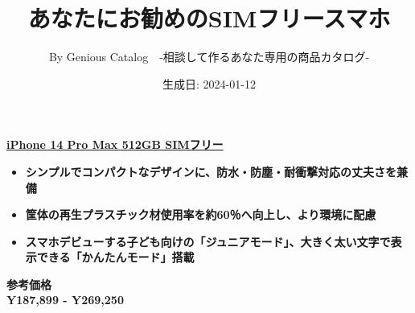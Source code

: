\documentclass[lualatex,paper=a4,airticle]{jlreq}
\title{\vspace{-3.5cm}あなたにお勧めのSIMフリースマホ}
\date{生成日: 2024-01-12}
\author{By Genious Catalog　-相談して作るあなた専用の商品カタログ-}
\begin{document}
\maketitle
\noindent
\begin{minipage}[t][0.45\textheight][t]{\textwidth}
\begin{minipage}{0.25\textwidth}
\href{http://www.apple.com}{
}
\end{minipage}%
\hfill
\begin{minipage}{0.85\textwidth}
\href{http://www.apple.com}{\huge{\textbf{iPhone 14 Pro Max 512GB SIMフリー}}}\par
\begin{itemize}
\setlength{\itemindent}{-10pt}
\item {\color{Purple}\mcfamily\bfseries\myfont シンプルでコンパクトなデザインに、防水・防塵・耐衝撃対応の丈夫さを兼備}
\item {\color{Purple}\mcfamily\bfseries\myfont 筐体の再生プラスチック材使用率を約60％へ向上し、より環境に配慮}
\item {\color{Purple}\mcfamily\bfseries\myfont スマホデビューする子ども向けの「ジュニアモード」、大きく太い文字で表示できる「かんたんモード」搭載}
\end{itemize}
\end{minipage}
\vspace{-1\baselineskip}
\begin{multicols}{2}
{\color{red}\textbf{参考価格}}\\
{\LARGE\color{red}\textbf{ Y\llap{=}187,899 - Y\llap{=}269,250}}\\
\\

\columnbreak


\end{multicols}
\end{minipage}
\end{document}

